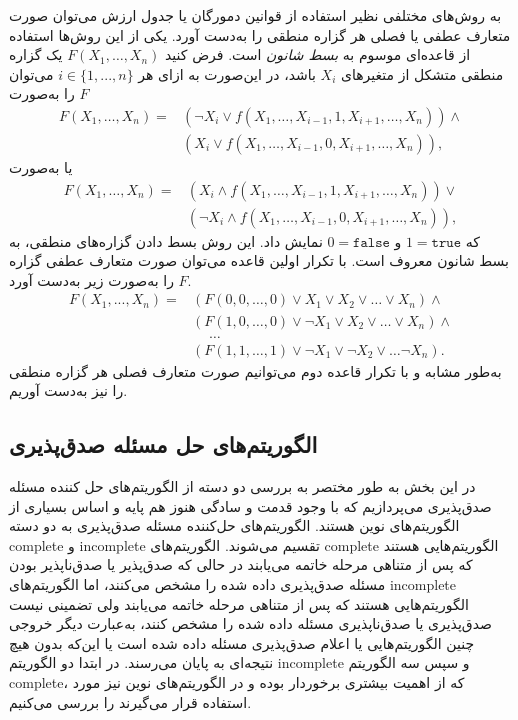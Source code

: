به روش‌های مختلفی نظیر استفاده از قوانین دمورگان  یا جدول ارزش  می‌توان صورت متعارف عطفی یا فصلی  هر گزاره منطقی را به‌دست آورد.  یکی از این روش‌ها استفاده از قاعده‌ای موسوم به 
\textit{بسط شانون}
 است. فرض کنید 
 $F(X_{1},\ldots,X_{n})$
 یک گزاره منطقی متشکل از متغیرهای 
 $X_{i}$
 باشد، در این‌صورت   به ازای هر  
 $i\in\{1,...,n\}$
می‌توان 
$F$
را به‌صورت 
 \begin{align*}
F(X_{1},\ldots,X_{n}) = &(\neg X_{i} \vee f(X_{1},\ldots, X_{i-1},1,X_{i+1},\ldots,X_{n}))\wedge\\
 &(X_{i}\vee f(X_{1},\ldots, X_{i-1},0,X_{i+1},\ldots,X_{n})),
 \end{align*}
 یا به‌صورت 
  \begin{align*}
  F(X_{1},\ldots,X_{n}) = &(X_{i} \wedge f(X_{1},\ldots, X_{i-1},1,X_{i+1},\ldots,X_{n}))\vee\\
  &(\neg X_{i}\wedge f(X_{1},\ldots, X_{i-1},0,X_{i+1},\ldots,X_{n})),
  \end{align*}
 که 
 $1 = \texttt{true}$
 و 
 $0 = \texttt{false}$
 نمایش داد. این روش بسط دادن گزاره‌‌‌های  منطقی،  به  بسط شانون معروف است.  با تکرار اولین قاعده   می‌توان  صورت متعارف عطفی گزاره 
$F$
را به‌صورت زیر به‌دست آورد. 
\begin{align*}
F(X_{1},...,X_{n}) =& (F(0,0,\ldots,0)\vee X_{1}\vee X_{2}\vee\ldots\vee X_{n}) \wedge\\
& (F(1,0,\ldots,0)\vee \neg X_{1}\vee X_{2}\vee \ldots\vee X_{n})\wedge\\
& \quad \ \ldots\\
&(F(1,1,\ldots,1)\vee\neg X_{1} \vee \neg X_{2} \vee\ldots  \neg X_{n}).
\end{align*}
به‌طور مشابه و با تکرار قاعده دوم می‌توانیم صورت متعارف فصلی هر گزاره منطقی را نیز به‌دست آوریم.  

\subsection{الگوریتم‌های حل مسئله صدق‌پذیری}
در این بخش به طور مختصر به بررسی دو دسته از الگوریتم‌های حل کننده مسئله صدق‌پذیری می‌پردازیم که با وجود قدمت و سادگی هنوز هم پایه و اساس بسیاری از الگوریتم‌های نوین  هستند. الگوریتم‌های حل‌کننده مسئله صدق‌پذیری به دو دسته 
 \gls*{complete}
 و 
 \gls*{incomplete}
 تقسیم می‌شوند. الگوریتم‌های 
 \gls*{complete}
 الگوریتم‌هایی هستند که پس از متناهی مرحله خاتمه می‌یابند در حالی که صدق‌پذیر یا صدق‌ناپذیر بودن مسئله صدق‌پذیری داده شده را مشخص می‌کنند، اما الگوریتم‌های 
 \gls*{incomplete}
الگوریتم‌هایی هستند که پس از متناهی مرحله خاتمه می‌یابند  ولی  تضمینی نیست صدق‌پذیری یا صدق‌ناپذیری مسئله داده شده را مشخص کنند، به‌عبارت دیگر خروجی چنین الگوریتم‌هایی یا اعلام صدق‌پذیری مسئله داده شده است یا این‌که بدون هیچ نتیجه‌ای به پایان می‌رسند.  در ابتدا دو  الگوریتم 
\gls*{incomplete}
و سپس سه الگوریتم 
\gls*{complete}، 
که از اهمیت بیشتری برخوردار بوده و در  الگوریتم‌های  نوین نیز مورد استفاده قرار می‌گیرند را بررسی می‌کنیم. 

